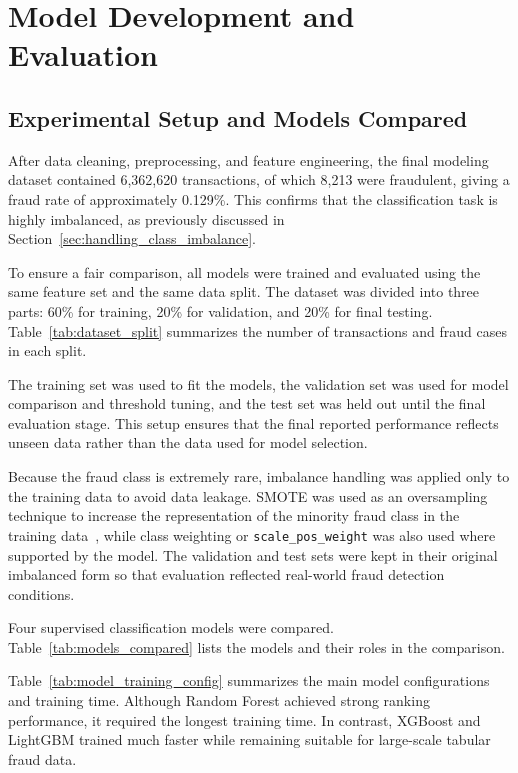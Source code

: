 \section{Model Development and Evaluation}
\label{sec:model_dev}  

\subsection{Experimental Setup and Models Compared}
\label{sec:experimental_setup_models}

After data cleaning, preprocessing, and feature engineering, the final modeling dataset contained 6,362,620 transactions, of which 8,213 were fraudulent, giving a fraud rate of approximately 0.129\%. This confirms that the classification task is highly imbalanced, as previously discussed in Section~\ref{sec:handling_class_imbalance}.

To ensure a fair comparison, all models were trained and evaluated using the same feature set and the same data split. The dataset was divided into three parts: 60\% for training, 20\% for validation, and 20\% for final testing. Table~\ref{tab:dataset_split} summarizes the number of transactions and fraud cases in each split.




The training set was used to fit the models, the validation set was used for model comparison and threshold tuning, and the test set was held out until the final evaluation stage. This setup ensures that the final reported performance reflects unseen data rather than the data used for model selection.

Because the fraud class is extremely rare, imbalance handling was applied only to the training data to avoid data leakage. SMOTE was used as an oversampling technique to increase the representation of the minority fraud class in the training data~\cite{chawla2002smote}, while class weighting or \texttt{scale\_pos\_weight} was also used where supported by the model. The validation and test sets were kept in their original imbalanced form so that evaluation reflected real-world fraud detection conditions.

Four supervised classification models were compared. Table~\ref{tab:models_compared} lists the models and their roles in the comparison.



Table~\ref{tab:model_training_config} summarizes the main model configurations and training time. Although Random Forest achieved strong ranking performance, it required the longest training time. In contrast, XGBoost and LightGBM trained much faster while remaining suitable for large-scale tabular fraud data.

